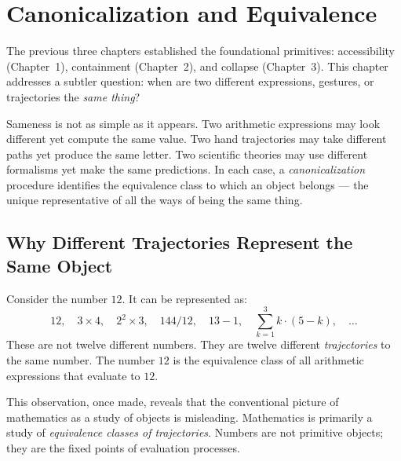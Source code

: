 
\chapter{Canonicalization and Equivalence}



The previous three chapters established the foundational primitives:
accessibility (Chapter~1), containment (Chapter~2), and collapse
(Chapter~3). This chapter addresses a subtler question: when are two
different expressions, gestures, or trajectories the \emph{same thing}?

Sameness is not as simple as it appears. Two arithmetic expressions may
look different yet compute the same value. Two hand trajectories may take
different paths yet produce the same letter. Two scientific theories may
use different formalisms yet make the same predictions. In each case, a
\emph{canonicalization} procedure identifies the equivalence class to which
an object belongs — the unique representative of all the ways of being
the same thing.

\section{Why Different Trajectories Represent the Same Object}

Consider the number $12$. It can be represented as:
\[
  12, \quad 3 \times 4, \quad 2^2 \times 3, \quad 144/12,
  \quad 13 - 1, \quad \sum_{k=1}^{3} k \cdot (5-k), \quad \ldots
\]
These are not twelve different numbers. They are twelve different
\emph{trajectories} to the same number. The number $12$ is the equivalence
class of all arithmetic expressions that evaluate to $12$.

This observation, once made, reveals that the conventional picture of
mathematics as a study of objects is misleading. Mathematics is primarily
a study of \emph{equivalence classes of trajectories}. Numbers are not
primitive objects; they are the fixed points of evaluation processes.

